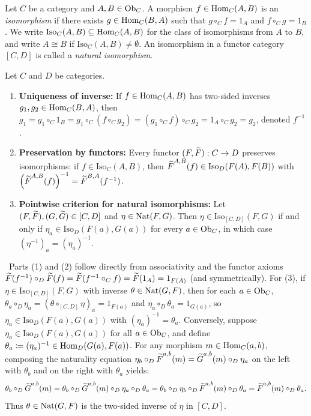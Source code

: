 \documentclass[10pt,a4paper]{article}
\begin{document}
\begin{definition}\label{def:iso}
Let $C$ be a category and $A, B \in {\textrm{Ob}}_C$. A morphism $f \in {\textrm{Hom}}_C(A, B)$ is an \emph{isomorphism} if there exists $g \in {\textrm{Hom}}_C(B, A)$ such that $g \circ_C f = 1_A$ and $f \circ_C g = 1_B$. We write $\mathrm{Iso}_C(A, B) \subseteq {\textrm{Hom}}_C(A, B)$ for the class of isomorphisms from $A$ to $B$, and write $A \cong B$ if $\mathrm{Iso}_C(A, B) \neq \emptyset$. An isomorphism in a functor category $[C, D]$ is called a \emph{natural isomorphism}.
\end{definition}

\begin{theorem}\label{thm:nat_iso}
Let $C$ and $D$ be categories.
\begin{enumerate}
\item \textbf{Uniqueness of inverse:} If $f \in {\textrm{Hom}}_C(A,B)$ has two-sided inverses $g_1, g_2 \in {\textrm{Hom}}_C(B,A)$, then $g_1 = g_1 \circ_C 1_B = g_1 \circ_C (f \circ_C g_2) = (g_1 \circ_C f) \circ_C g_2 = 1_A \circ_C g_2 = g_2$, denoted $f^{-1}$.
\item \textbf{Preservation by functors:} Every functor $(F, {\widetilde{F}\textrm{}}) : C \to D$ preserves isomorphisms: if $f \in \mathrm{Iso}_C(A,B)$, then ${\widetilde{F}\textrm{}}^{A,B}(f) \in \mathrm{Iso}_D(F(A), F(B))$ with $\left({\widetilde{F}\textrm{}}^{A,B}(f)\right)^{-1} = {\widetilde{F}\textrm{}}^{B,A}(f^{-1})$.
\item \textbf{Pointwise criterion for natural isomorphisms:} Let $(F, {\widetilde{F}\textrm{}}), (G, {\widetilde{G}\textrm{}}) \in [C, D]$ and $\eta \in {\textrm{Nat}}(F, G)$. Then $\eta \in \mathrm{Iso}_{[C,D]}(F, G)$ if and only if $\eta_a \in \mathrm{Iso}_D(F(a), G(a))$ for every $a \in {\textrm{Ob}}_C$, in which case $(\eta^{-1})_a = (\eta_a)^{-1}$.
\end{enumerate}
\end{theorem}
\myprf\ Parts (1) and (2) follow directly from associativity and the functor axioms ${\widetilde{F}\textrm{}}(f^{-1}) \circ_D {\widetilde{F}\textrm{}}(f) = {\widetilde{F}\textrm{}}(f^{-1} \circ_C f) = {\widetilde{F}\textrm{}}(1_A) = 1_{F(A)}$ (and symmetrically). For (3), if $\eta \in \mathrm{Iso}_{[C,D]}(F, G)$ with inverse $\theta \in {\textrm{Nat}}(G, F)$, then for each $a \in {\textrm{Ob}}_C$, $\theta_a \circ_D \eta_a = (\theta \circ_{[C,D]} \eta)_a = 1_{F(a)}$ and $\eta_a \circ_D \theta_a = 1_{G(a)}$, so $\eta_a \in \mathrm{Iso}_D(F(a), G(a))$ with $(\eta_a)^{-1} = \theta_a$. Conversely, suppose $\eta_a \in \mathrm{Iso}_D(F(a), G(a))$ for all $a \in {\textrm{Ob}}_C$, and define $\theta_a \coloneqq (\eta_a)^{-1} \in {\textrm{Hom}}_D(G(a), F(a))$. For any morphism $m \in {\textrm{Hom}}_C(a,b)$, composing the naturality equation $\eta_b \circ_D {\widetilde{F}\textrm{}}^{a,b}(m) = {\widetilde{G}\textrm{}}^{a,b}(m) \circ_D \eta_a$ on the left with $\theta_b$ and on the right with $\theta_a$ yields:
$$\theta_b \circ_D {\widetilde{G}\textrm{}}^{a,b}(m) = \theta_b \circ_D {\widetilde{G}\textrm{}}^{a,b}(m) \circ_D \eta_a \circ_D \theta_a = \theta_b \circ_D \eta_b \circ_D {\widetilde{F}\textrm{}}^{a,b}(m) \circ_D \theta_a = {\widetilde{F}\textrm{}}^{a,b}(m) \circ_D \theta_a.$$
Thus $\theta \in {\textrm{Nat}}(G, F)$ is the two-sided inverse of $\eta$ in $[C, D]$. \myqed
\end{document}
